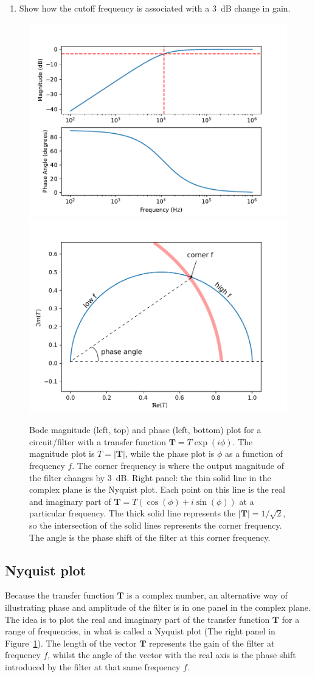 \documentclass{article}
\begin{document}
\begin{enumerate}
\item Show how the cutoff frequency is associated with a 3~dB change
  in gain.
\end{enumerate}

\begin{figure}
  \centering
  \includegraphics[width=0.49\columnwidth]{images/bodeplot} \hfill
  \includegraphics[width=0.49\columnwidth]{images/nyquist_annotated}
  \caption{Bode magnitude (left, top) and phase (left, bottom) plot
    for a circuit/filter with a transfer function
    $\mathbf{T}= T\exp{(i\phi)}$. The magnitude plot is
    $T=|\mathbf{T}|$, while the phase plot is $\phi$ as a
    function of frequency $f$. The corner frequency is where the
    output magnitude of the filter changes by 3~dB. Right panel: the thin
    solid line in the complex plane is the Nyquist plot. Each point on
    this line is the real and imaginary part of
    $\mathbf{T} = T(\cos(\phi)+ i \sin(\phi))$ at a particular
    frequency. The thick solid line represents the
    $|\mathbf{T}|=1/\sqrt{2}$, so the intersection of the
    solid lines represents the corner frequency. The angle is the
    phase shift of the filter at this corner frequency.}
  \label{fig:bodenyquist}
\end{figure}

\subsection*{Nyquist plot}
Because the transfer function $\mathbf{T}$ is a complex number, an
alternative way of illustrating phase and amplitude of the filter is
in one panel in the complex plane. The idea is to plot the real and
imaginary part of the transfer function $\mathbf{T}$ for a range of
frequencies, in what is called a Nyquist plot (The right panel in
Figure~\ref{fig:bodenyquist}). The length of the vector $\mathbf{T}$
represents the gain of the filter at frequency $f$, whilst the angle
of the vector with the real axis is the phase shift introduced by the
filter at that same frequency $f$.
\end{document}
